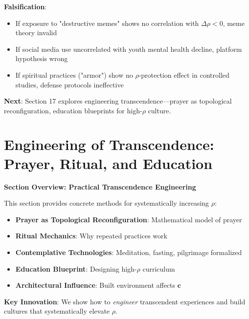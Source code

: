 \documentclass[11pt,a4paper]{article}
\theoremstyle{definition}
\theoremstyle{remark}
\newcommand{\cc}{\mathbf{c}}
\begin{document}
\begin{enumerate}
\begin{protocol}
\begin{mdframed}[backgroundcolor=green!10,linewidth=2pt,linecolor=green!70!black]
\textbf{Falsification}:
\begin{itemize}[nosep]
    \item If exposure to "destructive memes" shows no correlation with \(\Delta\rho < 0\), meme theory invalid
    \item If social media use uncorrelated with youth mental health decline, platform hypothesis wrong
    \item If spiritual practices ("armor") show no \(\rho\)-protection effect in controlled studies, defense protocols ineffective
\end{itemize}

\textbf{Next}: Section 17 explores engineering transcendence—prayer as topological reconfiguration, education blueprints for high-\(\rho\) culture.
\end{mdframed}


\section{Engineering of Transcendence: Prayer, Ritual, and Education}

\begin{mdframed}[backgroundcolor=cyan!5,linewidth=2pt]
\textbf{Section Overview: Practical Transcendence Engineering}

This section provides concrete methods for systematically increasing \(\rho\):

\begin{itemize}[nosep]
    \item \textbf{Prayer as Topological Reconfiguration}: Mathematical model of prayer
    \item \textbf{Ritual Mechanics}: Why repeated practices work
    \item \textbf{Contemplative Technologies}: Meditation, fasting, pilgrimage formalized
    \item \textbf{Education Blueprint}: Designing high-\(\rho\) curriculum
    \item \textbf{Architectural Influence}: Built environment affects \(\cc\)
\end{itemize}

\textbf{Key Innovation}: We show how to \textit{engineer} transcendent experiences and build cultures that systematically elevate \(\rho\).
\end{mdframed}


\end{protocol}
\end{enumerate}
\end{document}
